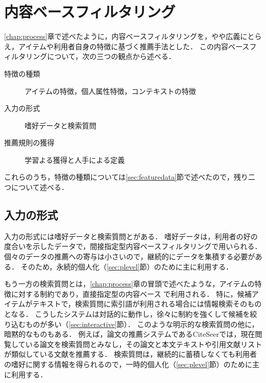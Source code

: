 \chapter{内容ベースフィルタリング}
\label{chap:cbf}

\ref{chap:process}章で述べたように，内容ベースフィルタリングを，やや広義にとらえ，アイテムや利用者自身の特徴に基づく推薦手法とした．
この内容ベースフィルタリングについて，次の三つの観点から述べる．
\begin{description}
 \item[特徴の種類] アイテムの特徴，個人属性特徴，コンテキストの特徴
 \item[入力の形式] 嗜好データと検索質問
 \item[推薦規則の獲得] 学習よる獲得と人手による定義
\end{description}
これらのうち，特徴の種類については\ref{sec:featuredata}節で述べたので，残り二つについて述べる．


\section{入力の形式}
\label{sec:cbfinput}

入力の形式には嗜好データと検索質問とがある．
嗜好データは，利用者の好の度合いを示したデータで，間接指定型内容ベースフィルタリング\cite{misc:091,tjsai:05:05,trjsai:06:01}で用いられる．
個々のデータの推薦への寄与は小さいので，継続的にデータを集積する必要がある．
そのため，永続的個人化（\ref{sec:plevel}節）のために主に利用する．

もう一方の検索質問とは，\ref{chap:process}章の冒頭で述べたような，アイテムの特徴に対する制約であり，直接指定型の内容ベース
\cite{ec:024,ijcai:03:04,jair:04:01,ieeem:07:06}で利用される．
特に，候補アイテムがテキストで，検索質問に索引語が利用される場合には情報検索\cite{jb:012:00}そのものとなる．
こうしたシステムは対話的に動作し，徐々に制約を強くして候補を絞り込むものが多い（\ref{sec:interactive}節）．
このような明示的な検索質問の他に，暗黙的なものもある．
例えば，論文の推薦システムであるCiteSeer\cite{ieeem:99:02}では，現在閲覧している論文を検索質問とみなし，その論文と本文テキストや引用文献リストが類似している文献を推薦する．
検索質問は，継続的に蓄積しなくても利用者の嗜好に関する情報を得られるので，一時的個人化（\ref{sec:plevel}節）のために主に利用する．


